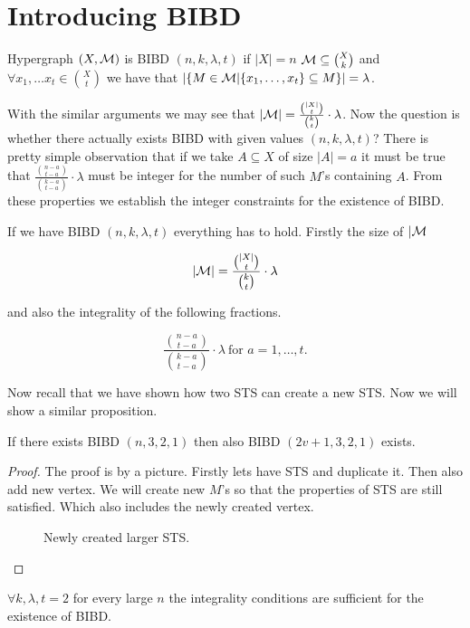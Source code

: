 \section{Introducing BIBD}

\begin{defn}[BIBD]
	Hypergraph $(X, \M)$ is BIBD $(n,k,\lambda,t)$ if $|X| = n$ $\M \subseteq \binom{X}{k}$ and $\forall x_1, \dots x_t \in \binom{X}{t}$ we have that $|\{M \in \M | \{x_1, \dots, x_t\} \subseteq M\}| = \lambda$. 
\end{defn}

With the similar arguments we may see that $|\M| = \frac{\binom{|X|}{t}}{\binom{k}{t}} \cdot \lambda$. Now the question is whether there actually exists BIBD with given values $(n,k,\lambda,t)$? There is pretty simple observation that if we take $A \subseteq X$ of size $|A| = a$ it must be true that $\frac{\binom{n - a}{t - a}}{\binom{k - a}{t - a}} \cdot \lambda$ must be integer for the number of such $M$'s containing $A$. From these properties we establish the integer constraints for the existence of BIBD.

\begin{prop}
	If we have BIBD $(n,k,\lambda,t)$ everything has to hold. Firstly the size of $|\M$
	
	$$
	|\M| = \frac{\binom{|X|}{t}}{\binom{k}{t}} \cdot \lambda
	$$
	
	\noindent and also the integrality of the following fractions.
	
	$$
	\frac{\binom{n - a}{t - a}}{\binom{k - a}{t - a}} \cdot \lambda \ \text{for } a = 1, \dots, t.
	$$
\end{prop}

Now recall that we have shown how two STS can create a new STS. Now we will show a similar proposition.

\begin{prop}
	If there exists BIBD $(n,3,2,1)$ then also BIBD $(2v +1,3,2,1)$ exists.
\end{prop}

\begin{proof}
	The proof is by a picture. Firstly lets have STS and duplicate it. Then also add new vertex. We will create new $M$'s so that the properties of STS are still satisfied. Which also includes the newly created vertex.
	
	\begin{figure}[!ht]\centering
		\begin{tikzpicture}
			
		\end{tikzpicture}
		\caption{Newly created larger STS.}
		\label{new-sts-twice}
	\end{figure}
\end{proof}

\begin{thm}
	$\forall k, \lambda, t =2$ for every large $n$ the integrality conditions are sufficient for the existence of BIBD.
\end{thm}